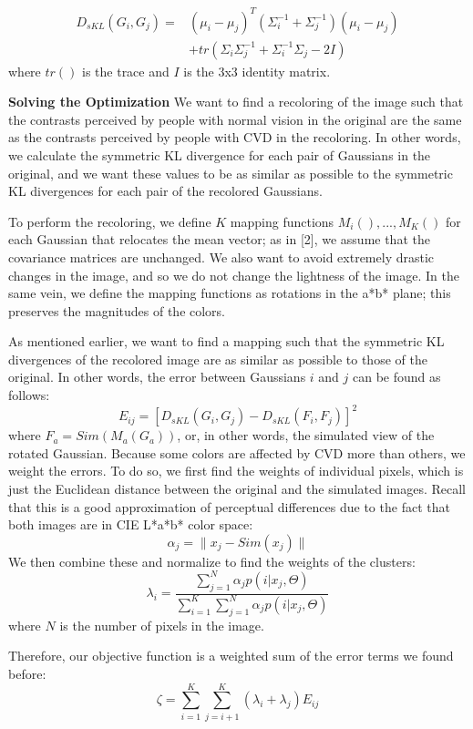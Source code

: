 \documentclass[10pt,twocolumn,letterpaper]{article}
\begin{document}
\begin{align*}
  D_{sKL}(G_i, G_j) = &(\mu_i - \mu_j)^T (\Sigma_i^{-1} + \Sigma_j^{-1}) (\mu_i - \mu_j) \\
  &+ tr(\Sigma_i \Sigma_j^{-1} + \Sigma_i^{-1} \Sigma_j - 2I)
\end{align*}
where $tr()$ is the trace and $I$ is the 3x3 identity matrix. 

\textbf{Solving the Optimization}
We want to find a recoloring of the image such that the contrasts perceived by people with normal vision in the original are the same as the contrasts perceived by people with CVD in the recoloring. In other words, we calculate the symmetric KL divergence for each pair of Gaussians in the original, and we want these values to be as similar as possible to the symmetric KL divergences for each pair of the recolored Gaussians. 

To perform the recoloring, we define $K$ mapping functions $M_i(), ..., M_K()$ for each Gaussian that relocates the mean vector; as in [2], we assume that the covariance matrices are unchanged. We also want to avoid extremely drastic changes in the image, and so we do not change the lightness of the image. In the same vein, we define the mapping functions as rotations in the a*b* plane; this preserves the magnitudes of the colors. 

As mentioned earlier, we want to find a mapping such that the symmetric KL divergences of the recolored image are as similar as possible to those of the original. In other words, the error between Gaussians $i$ and $j$ can be found as follows: 
\[
  E_{ij} = [D_{sKL}(G_i, G_j) - D_{sKL}(F_i, F_j)]^2
\]
where $F_a = Sim(M_a(G_a))$, or, in other words, the simulated view of the rotated Gaussian. Because some colors are affected by CVD more than others, we weight the errors. To do so, we first find the weights of individual pixels, which is just the Euclidean distance between the original and the simulated images. Recall that this is a good approximation of perceptual differences due to the fact that both images are in CIE L*a*b* color space: 
\[
  \alpha_j = \| x_j - Sim(x_j) \|
\]
We then combine these and normalize to find the weights of the clusters:
\[
  \lambda_i = \frac{\sum_{j=1}^N \alpha_j p(i | x_j, \Theta)}{\sum_{i=1}^K \sum_{j=1}^N \alpha_j p(i | x_j, \Theta)}
\]
where $N$ is the number of pixels in the image. 

Therefore, our objective function is a weighted sum of the error terms we found before:
\[
  \zeta = \sum_{i=1}^K \sum_{j=i+1}^K (\lambda_i + \lambda_j) E_{ij}
\]
\end{document}
